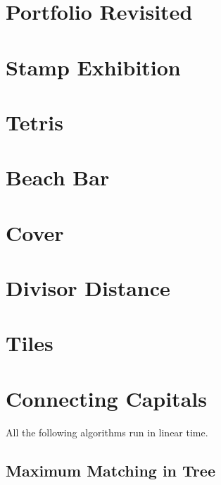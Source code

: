 \documentclass[a4paper, 10pt]{article}
\let\stdsection\section
\renewcommand\section{\newpage\stdsection}
\newcommand{\includecode}[1]{
    }
\begin{document}
    \section{Portfolio Revisited}
        \includecode{../problems/w10/Portfolios_Revisited/PortfolioRevisited1.cpp}
        
    \section{Stamp Exhibition}
        \includecode{../problems/w10/Stamp_Exhibition/Stamps1.cpp}
        
    \section{Tetris}
        \includecode{../problems/w10/Tetris/Tetris1.cpp}
 
    
    \section{Beach Bar}
        \includecode{../problems/w11/Beach_Bar/BeachBar1.cpp}
        
    \section{Cover}
        \includecode{../problems/w11/Cover/Cover1.cpp}
        
    \section{Divisor Distance}
        \includecode{../problems/w11/Divisor_Distance/DivisorDistance1.cpp}
        
    \section{Tiles}
        \includecode{../problems/w11/Tiles/Tiles1.cpp}
    
    \section{Connecting Capitals}
        All the following algorithms run in linear time.
        
        \subsection{Maximum Matching in Tree}
        \includecode{../problems/w11/Connecting_Capitals/MaximumMatchingTree.cpp}
        
\end{document}
